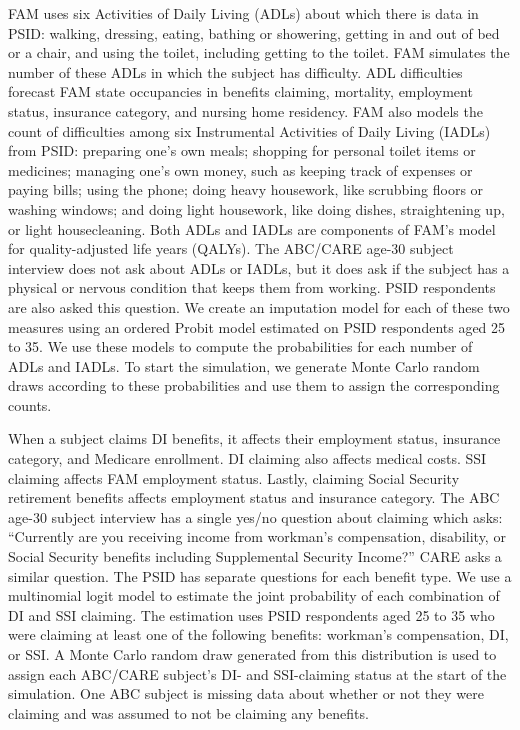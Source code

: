 \noindent FAM uses six Activities of Daily Living (ADLs) about which there is data in PSID: walking, dressing, eating, bathing or showering, getting in and out of bed or a chair, and using the toilet, including getting to the toilet.
FAM simulates the number of these ADLs in which the subject has difficulty.
ADL difficulties forecast FAM state occupancies in benefits claiming, mortality, employment status, insurance category, and nursing home residency.
FAM also models the count of difficulties among six Instrumental Activities of Daily Living (IADLs) from PSID: preparing one's own meals; shopping for personal toilet items or medicines; managing one's own money, such as keeping track of expenses or paying bills; using the phone; doing heavy housework, like scrubbing floors or washing windows; and doing light housework, like doing dishes, straightening up, or light housecleaning.
Both ADLs and IADLs are components of FAM's model for quality-adjusted life years (QALYs).
The ABC/CARE age-30 subject interview does not ask about ADLs or IADLs, but it does ask if the subject has a physical or nervous condition that keeps them from working.
PSID respondents are also asked this question.
We create an imputation model for each of these two measures using an ordered Probit model estimated on PSID respondents aged 25 to 35.
We use these models to compute the probabilities for each number of ADLs and IADLs. To start the simulation, we generate Monte Carlo random draws according to these probabilities and use them to assign the corresponding counts.

\noindent When a subject claims DI benefits, it affects their employment status, insurance category, and Medicare enrollment.
DI claiming also affects medical costs.
SSI claiming affects FAM employment status.
Lastly, claiming Social Security retirement benefits affects employment status and insurance category.
The ABC age-30 subject interview has a single yes/no question about claiming which asks: ``Currently are you receiving income from workman's compensation, disability, or Social Security benefits including Supplemental Security Income?'' CARE asks a similar question. The PSID has separate questions for each benefit type. We use a multinomial logit model to estimate the joint probability of each combination of DI and SSI claiming. The estimation uses PSID respondents aged 25 to 35 who were claiming at least one of the following benefits: workman's compensation, DI, or SSI. A Monte Carlo random draw generated from this distribution is used to assign each ABC/CARE subject's DI- and SSI-claiming status at the start of the simulation. One ABC subject is missing data about whether or not they were claiming and was assumed to not be claiming any benefits.

